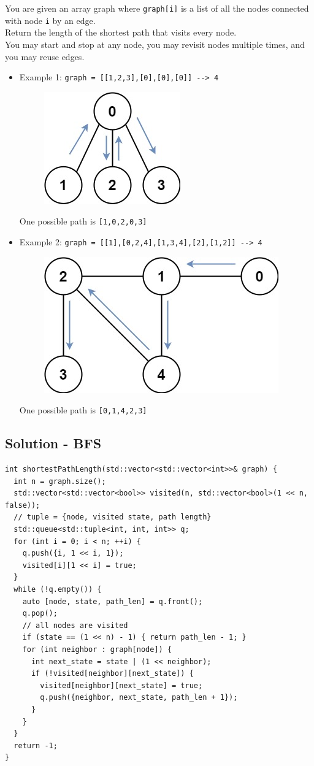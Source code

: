 You are given an array graph where {\colorbox{CodeBackground}{\lstinline|graph[i]|}} is a list of all the nodes connected with node {\colorbox{CodeBackground}{\lstinline|i|}} by an edge.\\

Return the length of the shortest path that visits every node. \\

You may start and stop at any node, you may revisit nodes multiple times, and you may reuse edges.

\begin{itemize}
\item Example 1: {\colorbox{CodeBackground}{\lstinline|graph = [[1,2,3],[0],[0],[0]] --> 4|}}
\begin{figure}[H]
\centering
\includegraphics[width=0.18\linewidth]{images/lc0847_eg1}
\label{fig:lc0847eg1}
\end{figure}
One possible path is {\colorbox{CodeBackground}{\lstinline|[1,0,2,0,3]|}}
\item Example 2: {\colorbox{CodeBackground}{\lstinline|graph = [[1],[0,2,4],[1,3,4],[2],[1,2]] --> 4|}}
\begin{figure}[H]
\centering
\includegraphics[width=0.3\linewidth]{images/lc0847_eg2}
\label{fig:lc0847eg2}
\end{figure}
One possible path is {\colorbox{CodeBackground}{\lstinline|[0,1,4,2,3]|}}
\end{itemize}

\subsection*{Solution - BFS}
\begin{lstlisting}
int shortestPathLength(std::vector<std::vector<int>>& graph) {
  int n = graph.size();
  std::vector<std::vector<bool>> visited(n, std::vector<bool>(1 << n, false));
  // tuple = {node, visited state, path length}
  std::queue<std::tuple<int, int, int>> q;
  for (int i = 0; i < n; ++i) {
    q.push({i, 1 << i, 1});
    visited[i][1 << i] = true;
  }
  while (!q.empty()) {
    auto [node, state, path_len] = q.front();
    q.pop();
    // all nodes are visited
    if (state == (1 << n) - 1) { return path_len - 1; }
    for (int neighbor : graph[node]) {
      int next_state = state | (1 << neighbor);
      if (!visited[neighbor][next_state]) {
        visited[neighbor][next_state] = true;
        q.push({neighbor, next_state, path_len + 1});
      }
    }
  }
  return -1;
}
\end{lstlisting}

